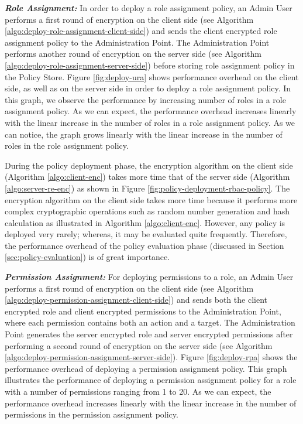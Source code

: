 \documentclass[final,5p,times,twocolumn]{elsarticle}
\begin{document}
\emph{\textbf{Role Assignment:}} 
In order to deploy a role assignment policy, an Admin User performs a first round of encryption on the client side (see Algorithm \ref{algo:deploy-role-assignment-client-side}) and sends the client encrypted role assignment policy to the Administration Point. The Administration Point performs another round of encryption on the server side (see Algorithm \ref{algo:deploy-role-assignment-server-side}) before storing role assignment policy in the Policy Store. Figure \ref{fig:deploy-ura} shows performance overhead on the client side, as well as on the server side in order to deploy a role assignment policy. In this graph, we observe the performance by increasing number of roles in a role assignment policy. As we can expect, the performance overhead increases linearly with the linear increase in the number of roles in a role assignment policy. As we can notice, the graph grows linearly with the linear increase in the number of roles in the role assignment policy.

During the policy deployment phase, the encryption algorithm on the client side (Algorithm \ref{algo:client-enc}) takes more time that of the server side (Algorithm \ref{algo:server-re-enc}) as shown in Figure \ref{fig:policy-deployment-rbac-policy}. The encryption algorithm on the client side takes more time because it performs more complex cryptographic operations such as random number generation and hash calculation as illustrated in Algorithm \ref{algo:client-enc}. However, any policy is deployed very rarely; whereas, it may be evaluated quite frequently. Therefore, the performance overhead of the policy evaluation phase (discussed in Section \ref{sec:policy-evaluation}) is of great importance.

\emph{\textbf{Permission Assignment:}} 
For deploying permissions to a role, an Admin User performs a first round of encryption on the client side (see Algorithm \ref{algo:deploy-permission-assignment-client-side}) and sends both the client encrypted role and client encrypted permissions to the Administration Point, where each permission contains both an action and a target. The Administration Point generates the server encrypted role and server encrypted permissions after performing a second round of encryption on the server side (see Algorithm \ref{algo:deploy-permission-assignment-server-side}). Figure \ref{fig:deploy-rpa} shows the performance overhead of deploying a permission assignment policy. This graph illustrates the performance of deploying a permission assignment policy for a role with a number of permissions ranging from 1 to 20. As we can expect, the performance overhead increases linearly with the linear increase in the number of permissions in the permission assignment policy.
\end{document}
